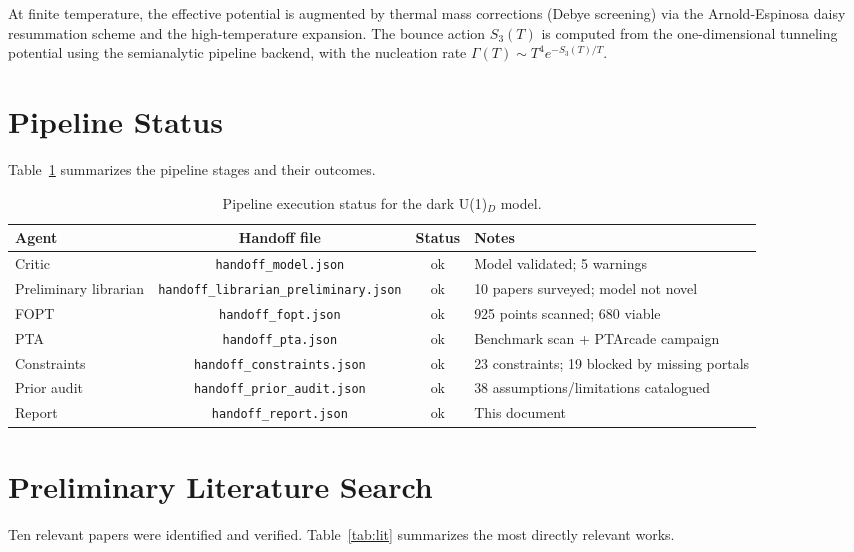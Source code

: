 \documentclass[a4paper,11pt]{article}
\begin{document}
At finite temperature, the effective potential is augmented by thermal mass corrections (Debye screening) via the Arnold-Espinosa daisy resummation scheme and the high-temperature expansion. The bounce action $S_3(T)$ is computed from the one-dimensional tunneling potential using the semianalytic pipeline backend, with the nucleation rate $\Gamma(T) \sim T^4 e^{-S_3(T)/T}$.

\section{Pipeline Status}

Table~\ref{tab:pipeline} summarizes the pipeline stages and their outcomes.

\begin{table}[htbp]
\centering
\caption{Pipeline execution status for the dark U(1)$_D$ model.}
\label{tab:pipeline}
\begin{tabular}{lccp{4cm}}
\toprule
Agent & Handoff file & Status & Notes \\
\midrule
Critic & \texttt{handoff\_model.json} & ok & Model validated; 5 warnings \\
Preliminary librarian & \texttt{handoff\_librarian\_preliminary.json} & ok & 10 papers surveyed; model not novel \\
FOPT & \texttt{handoff\_fopt.json} & ok & 925 points scanned; 680 viable \\
PTA & \texttt{handoff\_pta.json} & ok & Benchmark scan + PTArcade campaign \\
Constraints & \texttt{handoff\_constraints.json} & ok & 23 constraints; 19 blocked by missing portals \\
Prior audit & \texttt{handoff\_prior\_audit.json} & ok & 38 assumptions/limitations catalogued \\
Report & \texttt{handoff\_report.json} & ok & This document \\
\bottomrule
\end{tabular}
\end{table}

\section{Preliminary Literature Search}

Ten relevant papers were identified and verified. Table~\ref{tab:lit} summarizes the most directly relevant works.
\end{document}
